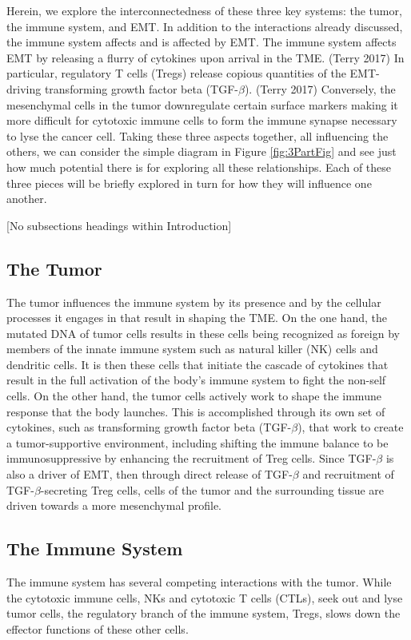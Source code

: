 \documentclass{article}
\begin{document}
Herein, we explore the interconnectedness of these three key systems: the tumor, the immune system, and EMT.
In addition to the interactions already discussed, the immune system affects and is affected by EMT.
The immune system affects EMT by releasing a flurry of cytokines upon arrival in the TME. (Terry 2017) 
In particular, regulatory T cells (Tregs) release copious quantities of the EMT-driving transforming growth factor beta (TGF-$\beta$). (Terry 2017) 
Conversely, the mesenchymal cells in the tumor downregulate certain surface markers making it more difficult for cytotoxic immune cells to form the immune synapse necessary to lyse the cancer cell.
Taking these three aspects together, all influencing the others, we can consider the simple diagram in Figure \ref{fig:3PartFig} and see just how much potential there is for exploring all these relationships.
Each of these three pieces will be briefly explored in turn for how they will influence one another.

[No subsections headings within Introduction]
\subsection{The Tumor}\label{TheTumor}
The tumor influences the immune system by its presence and by the cellular processes it engages in that result in shaping the TME.
On the one hand, the mutated DNA of tumor cells results in these cells being recognized as foreign by members of the innate immune system such as natural killer (NK) cells and dendritic cells.
It is then these cells that initiate the cascade of cytokines that result in the full activation of the body's immune system to fight the non-self cells.
On the other hand, the tumor cells actively work to shape the immune response that the body launches.
This is accomplished through its own set of cytokines, such as transforming growth factor beta (TGF-$\beta$), that work to create a tumor-supportive environment, including shifting the immune balance to be immunosuppressive by enhancing the recruitment of Treg cells. Since TGF-$\beta$ is also a driver of EMT, then through direct release of TGF-$\beta$ and recruitment of TGF-$\beta$-secreting Treg cells, cells of the tumor and the surrounding tissue are driven towards a more mesenchymal profile. 


\subsection{The Immune System}\label{TheImmuneSystem}
The immune system has several competing interactions with the tumor.
While the cytotoxic immune cells, NKs and cytotoxic T cells (CTLs), seek out and lyse tumor cells, the regulatory branch of the immune system, Tregs, slows down the effector functions of these other cells.
\end{document}
